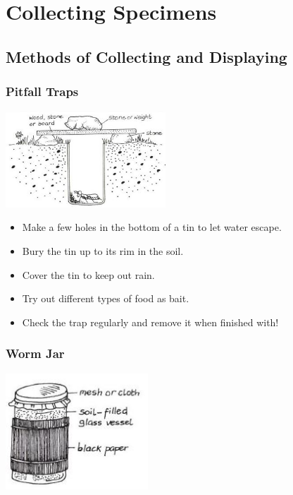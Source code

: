\chapter{Collecting Specimens} %


\section{Methods of Collecting and Displaying}  

\begin{multicols}{2}

\subsection{Pitfall Traps}

\begin{center}
\includegraphics[width=0.45\textwidth]{./img/vso/pitfall.jpg}
\end{center}

\begin{itemize}
\item Make a few holes in the bottom
of a tin to let water escape.
\item Bury the tin up to its rim in the
soil.
\item Cover the tin to keep out rain.
\item Try out different types of food
as bait.
\item Check the trap regularly and
remove it when finished with!
\end{itemize}


\subsection{Worm Jar}

\begin{center}
\includegraphics[width=0.4\textwidth]{./img/vso/worm-jar.jpg}
\end{center}


\end{multicols}
